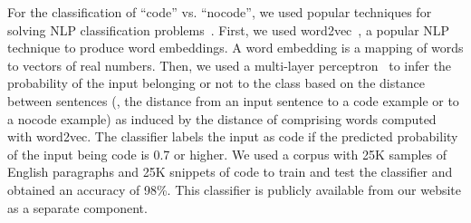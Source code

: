 \documentclass[smallextended]{svjour3}
\begin{document}

For the classification of ``code'' vs. ``nocode'', we used popular
techniques for solving NLP classification
problems~\cite{kusner2015word}.  First, we used
word2vec~\cite{mikolov2013distributed}, a popular NLP technique to
produce word embeddings. A word embedding is a mapping of words to
vectors of real numbers. Then, we used a multi-layer
perceptron~\cite{Rumelhart:1986:LIR:104279.104293} to infer the
probability of the input belonging or not to the class based on the
distance between sentences (\ie{}, the distance from an input sentence
to a code example or to a nocode example) as induced by the distance
of comprising words computed with word2vec. The classifier labels the
input as code if the predicted probability of the input being code is
0.7 or higher.  We used a corpus with 25K samples of English
paragraphs and 25K snippets of \js{} code to train and test the
classifier and obtained an accuracy of 98\%. This classifier is
publicly available from our website as a separate component.

\end{document}
